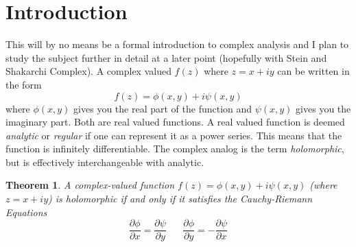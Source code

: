 \documentclass{report}
\newtheorem{theorem}{Theorem}[chapter]
\theoremstyle{definition}
\theoremstyle{remark}
\newcommand{\twen}{\hspace{20pt}}
\newcommand{\pd}[2]{\frac{\partial #1}{\partial#2}}
\begin{document}
\section{Introduction}
This will by no means be a formal introduction to complex analysis and I plan to study the subject further in detail at a later point (hopefully with Stein and Shakarchi Complex). A complex valued $f(z)$ where $z=x+iy$ can be written in the form 
\begin{equation*}
    f(z) =\phi(x,y) +i\psi(x,y)
\end{equation*}
where $\phi(x,y)$ gives you the real part of the function and $\psi(x,y)$ gives you the imaginary part. Both are real valued functions. A real valued function is deemed \textit{analytic} or \textit{regular} if one can represent it as a power series. This means that the function is infinitely differentiable. The complex analog is the term \textit{holomorphic}, but is effectively interchangeable with analytic. 
\begin{theorem}
    A complex-valued function $f(z)=\phi(x,y) + i \psi(x,y)$ (where $z=x+iy$) is holomorphic if and only if it satisfies the Cauchy-Riemann Equations 
    \begin{equation*}
    \pd{\phi}{x}=\pd{\psi}{y} \twen \pd{\phi}{y} =-\pd{\psi}{x}
\end{equation*}
\end{theorem}
\end{document}
